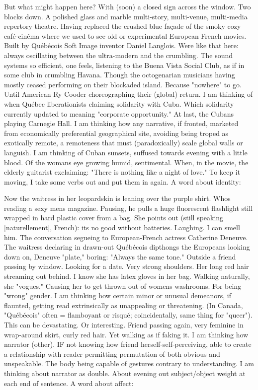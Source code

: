 But what might happen here? With (soon) a closed sign across the window.
Two blocks down. A polished glass and marble multi-story, multi-venue,
multi-media repertory theatre. Having replaced the crushed blue façade
of the smoky cozy café-cinéma where we used to see old or experimental
European French movies. Built by Québécois Soft Image inventor Daniel
Langlois. Were like that here: always oscillating between the
ultra-modern and the crumbling. The sound systems so efficient, one
feels, listening to the Buena Vista Social Club, as if in some club in
crumbling Havana. Though the octogenarian musicians having mostly ceased
performing on their blockaded island. Because "nowhere" to go. Until
American Ry Cooder choreographing their (global) return. I am thinking
of when Québec liberationists claiming solidarity with Cuba. Which
solidarity currently updated to meaning "corporate opportunity." At
last, the Cubans playing Carnegie Hall. I am thinking how any narrative,
if fronted, marketed from economically preferential geographical site,
avoiding being troped as exotically remote, a remoteness that must
(paradoxically) scale global walls or languish. I am thinking of Cuban
sunsets, suffused towards evening with a little blood. Of the womans eye
growing humid, sentimental. When, in the movie, the elderly guitarist
exclaiming: "There is nothing like a night of love." To keep it moving,
I take some verbs out and put them in again. A word about identity:

Now the waitress in her leopardskin is leaning over the purple shirt.
Whos reading a sexy mens magazine. Pausing, he pulls a huge fluorescent
flashlight still wrapped in hard plastic cover from a bag. She points
out (still speaking {[}naturellement{]}, French): its no good without
batteries. Laughing. I can smell him. The conversation segueing to
European-French actress Catherine Deneuve. The waitress declaring in
drawn-out Québécois dipthongs the Europeans looking down on, Deneuve
"plate," boring: "Always the same tone." Outside a friend passing by
window. Looking for a date. Very strong shoulders. Her long red hair
streaming out behind. I know she has latex gloves in her bag. Walking
naturally, she "vogues." Causing her to get thrown out of womens
washrooms. For being "wrong" gender. I am thinking how certain minor or
unusual demeanors, if flaunted, getting read extrinsically as
unappealing or threatening. (In Canada, "Québécois" often = flamboyant
or risqué; coincidentally, same thing for "queer"). This can be
devastating. Or interesting. Friend passing again, very feminine in
wrap-around skirt, curly red hair. Yet walking as if faking it. I am
thinking how narrator (other). IF not knowing how friend
herself-self-perceiving, able to create a relationship with reader
permitting permutation of both obvious and unspeakable. The body being
capable of gestures contrary to understanding. I am thinking about
narrator as double. About evening out subject/object weight at each end
of sentence. A word about affect:

